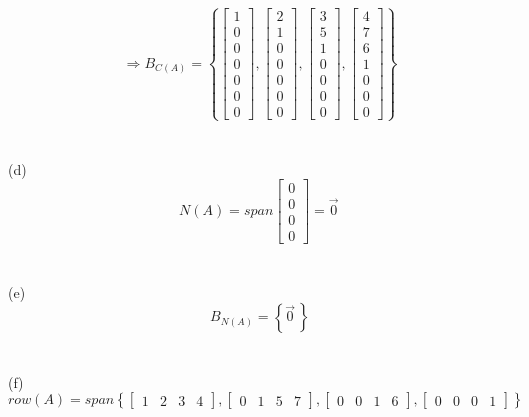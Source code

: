 \documentclass{article}
\begin{document}
\[\Rightarrow B_{C(A)}=\left\{\begin{bmatrix}1\\0\\0\\0\\0\\0\\0\end{bmatrix},\begin{bmatrix}2\\1\\0\\0\\0\\0\\0\end{bmatrix},\begin{bmatrix}3\\5\\1\\0\\0\\0\\0\end{bmatrix},\begin{bmatrix}4\\7\\6\\1\\0\\0\\0\end{bmatrix}\right\}
\]
\\\\(d)	\[N(A)=span\begin{bmatrix}0\\0\\0\\0\end{bmatrix}=\vec{0}^{\,}\]
\\\\(e)\[B_{N(A)}=\left\{\vec{0}^{\,}\right\}\]
\\\\(f)\[row(A)=span\left\{\begin{bmatrix}1&2&3&4\end{bmatrix},\begin{bmatrix}0&1&5&7\end{bmatrix},\begin{bmatrix}0&0&1&6\end{bmatrix},\begin{bmatrix}0&0&0&1\end{bmatrix}\right\}\]\\\\\\
\end{document}
